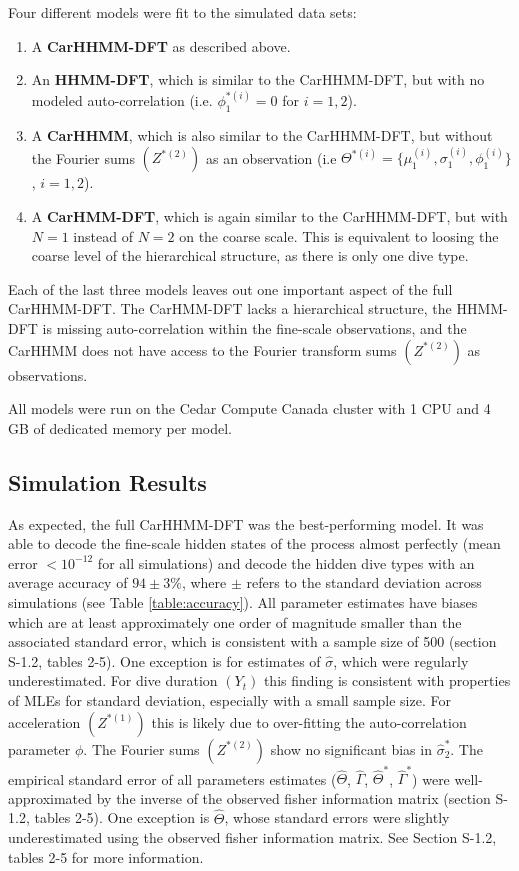 Four different models were fit to the simulated data sets:
\begin{enumerate}
    \item A \textbf{CarHHMM-DFT} as described above.
    \item An \textbf{HHMM-DFT}, which is similar to the CarHHMM-DFT, but with no modeled auto-correlation \big(i.e. $\phi_1^{*(i)} = 0$ for $i = 1,2$\big).
    \item A \textbf{CarHHMM}, which is also similar to the CarHHMM-DFT, but without the Fourier sums $(Z^{*(2)})$ as an observation \big(i.e $\Theta^{*(i)} = \{\mu_1^{(i)},\sigma_1^{(i)},\phi_1^{(i)}\}$, $i = 1,2$\big).
    \item A \textbf{CarHMM-DFT}, which is again similar to the CarHHMM-DFT, but with $N=1$ instead of $N=2$ on the coarse scale. This is equivalent to loosing the coarse level of the hierarchical structure, as there is only one dive type.
\end{enumerate}
%
Each of the last three models leaves out one important aspect of the full CarHHMM-DFT. The CarHMM-DFT lacks a hierarchical structure, the HHMM-DFT is missing auto-correlation within the fine-scale observations, and the CarHHMM does not have access to the Fourier transform sums $(Z^{*(2)})$ as observations. 

All models were run on the Cedar Compute Canada cluster with 1 CPU and 4 GB of dedicated memory per model.

\subsection{Simulation Results}


As expected, the full CarHHMM-DFT was the best-performing model. It was able to decode the fine-scale hidden states of the process almost perfectly (mean error $< 10^{-12}$ for all simulations) and decode the hidden dive types with an average accuracy of $94 \pm 3 \%$, where $\pm$ refers to the standard deviation across simulations (see Table \ref{table:accuracy}). All parameter estimates have biases which are at least approximately one order of magnitude smaller than the associated standard error, which is consistent with a sample size of 500 (section S-1.2, tables 2-5). One exception is for estimates of $\hat \sigma$, which were regularly underestimated. For dive duration $(Y_t)$ this finding is consistent with properties of MLEs for standard deviation, especially with a small sample size. For acceleration $(Z^{*(1)})$ this is likely due to over-fitting the auto-correlation parameter $\phi$. The Fourier sums $(Z^{*(2)})$ show no significant bias in $\hat \sigma^*_2$. The empirical standard error of all parameters estimates ($\hat \Theta$, $\hat \Gamma$, $\hat \Theta^*$, $\hat \Gamma^*$) were well-approximated by the inverse of the observed fisher information matrix (section S-1.2, tables 2-5). One exception is $\hat \Theta$, whose standard errors were slightly underestimated using the observed fisher information matrix. 
See Section S-1.2, tables 2-5 for more information.

